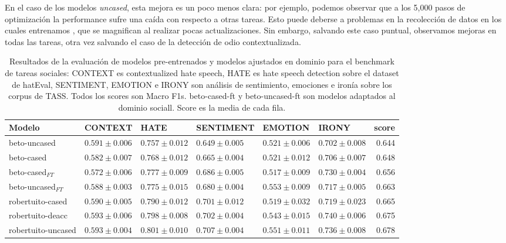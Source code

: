 En el caso de los modelos \emph{uncased}, esta mejora es un poco menos clara: por ejemplo, podemos observar que a los 5,000 pasos de optimización la performance sufre una caída con respecto a otras tareas. Esto puede deberse a problemas en la recolección de datos en los cuales entrenamos \robertuito{}, que se magnifican al realizar pocas actualizaciones. Sin embargo, salvando este caso puntual, observamos mejoras en todas las tareas, otra vez salvando el caso de la detección de odio contextualizada.



\begin{table}[ht]
    \centering
    \footnotesize
    \begin{tabular}{llllllr}
        \toprule
        Modelo             & CONTEXT                   &  HATE              &  SENTIMENT        &  EMOTION          &  IRONY            &     score \\
        \midrule
        beto-uncased       & $0.591 \pm 0.006$ & $0.757 \pm 0.012$ & $0.649 \pm 0.005$ & $0.521 \pm 0.006$& $0.702 \pm 0.008$& 0.644 \\
        beto-cased         & $0.582 \pm 0.007$ & $0.768 \pm 0.012$ & $0.665 \pm 0.004$ & $0.521 \pm 0.012$& $0.706 \pm 0.007$& 0.648 \\
        beto-cased$_{FT}$   & $0.572 \pm 0.006$ & $0.777 \pm 0.009$ & $0.686 \pm 0.005$ & $0.517 \pm 0.009$& $0.730 \pm 0.004$& 0.656 \\
        beto-uncased$_{FT}$ & $0.588 \pm 0.003$ & $0.775 \pm 0.015$ & $0.680 \pm 0.004$ & $0.553 \pm 0.009$& $0.717 \pm 0.005$& 0.663 \\
        \hline
        robertuito-cased   & $0.590 \pm 0.005$ & $0.790 \pm 0.012$ & $0.701 \pm 0.012$ & $0.519 \pm 0.032$& $0.719 \pm 0.023$& 0.665 \\
        robertuito-deacc   & $0.593 \pm 0.006$ & $0.798 \pm 0.008$ & $0.702 \pm 0.004$ & $0.543 \pm 0.015$& $0.740 \pm 0.006$& 0.675 \\
        robertuito-uncased & $0.593 \pm 0.004$ & $0.801 \pm 0.010$ & $0.707 \pm 0.004$ & $0.551 \pm 0.011$& $0.736 \pm 0.008$& 0.678 \\
        \bottomrule
    \end{tabular}
    \caption{Resultados de la evaluación de modelos pre-entrenados y modelos ajustados en dominio para el benchmark de tareas sociales: CONTEXT es contextualized hate speech, HATE es hate speech detection sobre el dataset de hatEval, SENTIMENT, EMOTION e IRONY son análisis de sentimiento, emociones e ironía sobre los corpus de TASS. Todos los scores son Macro F1s. beto-cased-ft y beto-uncased-ft son modelos adaptados al dominio sociall. Score es la media de cada fila. }

    \label{tab:domain_adaptation_evaluation_results}

\end{table}

